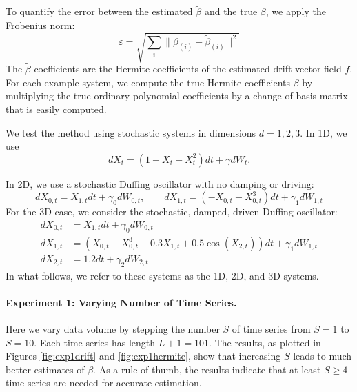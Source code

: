 \documentclass{article}
\begin{document}
To quantify the error between the estimated $\widetilde{\beta}$ and the true $\beta$, we apply the Frobenius norm:
\begin{equation}
\label{eqn:frob}
\varepsilon = \sqrt{\sum_i \| \beta_{(i)} - \widetilde{\beta}_{(i)} \|^2 }
\end{equation}
The $\widetilde{\beta}$ coefficients are the Hermite coefficients of the estimated drift vector field $f$.  For each example system, we compute the true Hermite coefficients $\beta$ by multiplying the true ordinary polynomial coefficients by a change-of-basis matrix that is easily computed.

We test the method using stochastic systems in dimensions $d= 1, 2, 3$.  In 1D, we use
\begin{equation*}
dX_t = (1 + X_t - X_t^2 ) dt + \gamma dW_t.
\end{equation*}

In 2D, we use a stochastic Duffing oscillator with no damping or driving:
\begin{equation*}
dX_{0,t} = X_{1,t} dt + \gamma_0 dW_{0,t}, \qquad
dX_{1,t} = (-X_{0,t} - X^3_{0,t}) dt + \gamma_1 dW_{1,t}
\end{equation*}
For the 3D case, we consider the stochastic, damped, driven Duffing oscillator:
\begin{align*}
dX_{0,t} & = X_{1,t} dt + \gamma_0 dW_{0,t} \\
dX_{1,t} & = (X_{0,t} - X_{0,t}^3 - 0.3 X_{1,t} + 0.5 \cos (X_{2,t})) dt + \gamma_1 dW_{1,t} \\
dX_{2,t} & = 1.2 dt + \gamma_2 dW_{2,t}
\end{align*}
In what follows, we refer to these systems as the 1D, 2D, and 3D systems.

\vspace{-1.5ex}
\paragraph{Experiment 1: Varying Number of Time Series.} Here we vary data volume by stepping the number $S$ of time series from $S=1$ to $S=10$.  Each time series has length $L+1 = 101$.  The results, as plotted in Figures \ref{fig:exp1drift} and \ref{fig:exp1hermite}, show that increasing $S$ leads to much better estimates of $\beta$.  As a rule of thumb, the results indicate that at least $S \geq 4$ time series are needed for accurate estimation.
\end{document}
